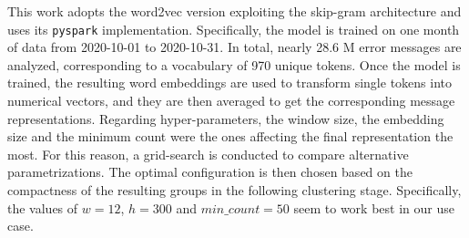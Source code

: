 This work adopts the word2vec version exploiting the skip-gram architecture and uses its \texttt{pyspark} implementation.
Specifically, the model is trained on one month of data from 2020-10-01 to 2020-10-31.
In total, nearly 28.6 M error messages are analyzed, corresponding to a vocabulary of 970 unique tokens.
Once the model is trained, the resulting word embeddings are used to transform single tokens into numerical vectors, and they are then averaged to get the corresponding message representations.
Regarding hyper-parameters, the window size, the embedding size and the minimum count were the ones affecting the final representation the most.
For this reason, a grid-search is conducted to compare alternative parametrizations.  
The optimal configuration is then chosen based on the compactness of the resulting groups in the following clustering stage.
Specifically, the values of $w=12$, $h=300$ and $min\_count=50$ seem to work best in our use case.

